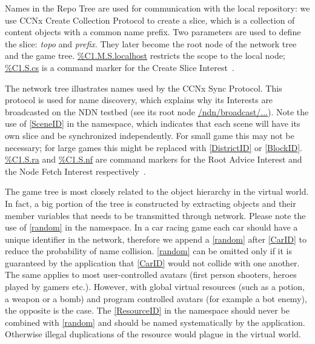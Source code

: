 \documentclass{sigchi}
\begin{document}
Names in the Repo Tree are used for communication with the local repository: we use CCNx Create Collection Protocol to create a slice, which is a collection of content objects with a common name prefix. Two parameters are used to define the slice: \emph{topo} and \emph{prefix}. They later become the root node of the network tree and the game tree. \url{\%C1.M.S.localhost} restricts the scope to the local node; \url{\%C1.S.cs} is a command marker for the Create Slice Interest~\cite{CCNxCS}. 

The network tree illustrates names used by the CCNx Sync Protocol. This protocol is used for name discovery, which explains why its Interests are broadcasted on the NDN testbed (see its root node \url{/ndn/broadcast/...}). Note the use of \url{[SceneID]} in the namespace, which indicates that each scene will have its own slice and be synchronized independently. For small game this may not be necessary; for large games this might be replaced with \url{[DistrictID]} or \url{[BlockID]}. \url{\%C1.S.ra} and \url{\%C1.S.nf} are command markers for the Root Advice Interest and the Node Fetch Interest respectively~\cite{CCNxSync}.

The game tree is most closely related to the object hierarchy in the virtual world. In fact, a big portion of the tree is constructed by extracting objects and their member variables that needs to be transmitted through network. Please note the use of \url{[random]} in the namespace. In a car racing game each car should have a unique identifier in the network, therefore we append a \url{[random]} after \url{[CarID]} to reduce the probability of name collision. \url{[random]} can be omitted only if it is guaranteed by the application that  \url{[CarID]}  would not collide with one another. The same applies to most user-controlled avatars (first person shooters, heroes played by gamers etc.). However, with global virtual resources (such as a potion, a weapon or a bomb) and program controlled avatars (for example a bot enemy), the opposite is the case. The \url{[ResourceID]} in the namespace should never be combined with \url{[random]} and should be named systematically by the application. Otherwise illegal duplications of the resource would plague in the virtual world. 
\end{document}

